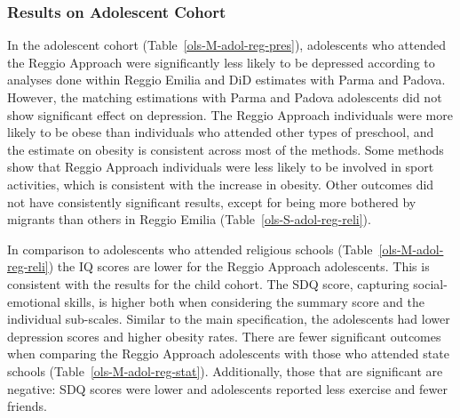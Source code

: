 \subsubsection{Results on Adolescent Cohort}
In the adolescent cohort (Table~\ref{ols-M-adol-reg-pres}), adolescents who attended the Reggio Approach were significantly less likely to be depressed according to analyses done within Reggio Emilia and DiD estimates with Parma and Padova. However, the matching estimations with Parma and Padova adolescents did not show significant effect on depression. The Reggio Approach individuals were more likely to be obese than individuals who attended other types of preschool, and the estimate on obesity is consistent across most of the methods. Some methods show that Reggio Approach individuals were less likely to be involved in sport activities, which is consistent with the increase in obesity. Other outcomes did not have consistently significant results, except for being more bothered by migrants than others in Reggio Emilia (Table~\ref{ols-S-adol-reg-reli}). 

In comparison to adolescents who attended religious schools (Table~\ref{ols-M-adol-reg-reli}) the IQ scores are lower for the Reggio Approach adolescents. This is consistent with the results for the child cohort. The SDQ score, capturing social-emotional skills, is higher both when considering the summary score and the individual sub-scales. Similar to the main specification, the adolescents had lower depression scores and higher obesity rates. There are fewer significant outcomes when comparing the Reggio Approach adolescents with those who attended state schools (Table~\ref{ols-M-adol-reg-stat}). Additionally, those that are significant are negative: SDQ scores were lower and adolescents reported less exercise and fewer friends.



